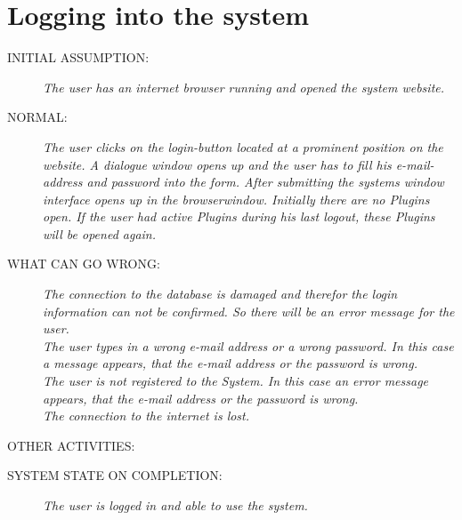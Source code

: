 \section{Logging into the system}
\begin{description}
  \item [INITIAL ASSUMPTION:]
    \textit{The user has an internet browser running and
opened the system website.}
  \item [NORMAL:]
    \textit{The user clicks on the login-button located at a prominent position
on the website. A dialogue window opens up and the user has to fill his
e-mail-address and password into the form. After submitting the systems
window interface opens up in the browserwindow. Initially there are no Plugins
open. If the user had active Plugins during his last logout, these
Plugins will be opened again.}
  \item [WHAT CAN GO WRONG:]
    \textit{The connection to the database is damaged
and therefor the login information can not be confirmed. So there will be an error message for the user.\\ 
The user types in a wrong e-mail address or a wrong password. In this case a message appears, that the e-mail address or the password is wrong.\\
The user is not registered to the System. In this case an error message appears, that the e-mail address or the password is wrong.\\ 
The connection to the internet is lost.
}
  \item [OTHER ACTIVITIES:]
    \textit{}
  \item [SYSTEM STATE ON COMPLETION:]
    \textit{The user is logged in and able to use the system.}
\end{description}

